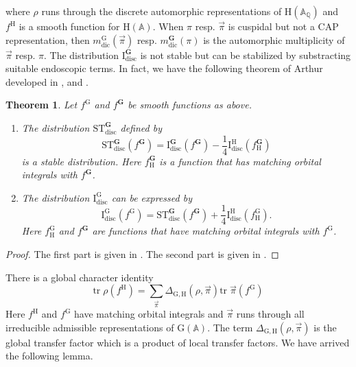 \documentclass[10pt]{amsart}
\numberwithin{equation}{section}
\newtheorem{theorem}[equation]{Theorem}
\theoremstyle{definition}
\def\bfG{\mathbf{G}}
\def\QQ{\mathbb{Q}}
\def\rmG{\mathrm{G}}
\def\rmH{\mathrm{H}}
\def\rmI{\mathrm{I}}
\begin{document}
where $\rho$ runs through the discrete automorphic representations of $\rmH(\mathbb{A}_{\QQ})$ and $f^{\rmH}$ is a smooth function for $\rmH(\mathbb{A})$.
When $\pi$ resp. $\vec{\pi}$ is cuspidal  but not a CAP representation, then $m^{\rmG}_{\mathrm{dic}}(\vec{\pi})$ resp. $m^{\bfG}_{\mathrm{dic}}(\pi)$ is the automorphic multiplicity of $\vec{\pi}$ resp. $\pi$. The distribution $\rmI^{\bfG}_{\mathrm{disc}}$ is not stable but can be stabilized by substracting suitable endoscopic terms. In fact, we have the following theorem of Arthur developed in \cite{Art-1}, \cite{Art-2} and \cite{Art-Main}.
\begin{theorem}\label{Arthur}
Let $f^{\rmG}$ and $f^{\bfG}$ be smooth functions as above.
\begin{enumerate}
\item The distribution $\mathrm{ST}^{\bfG}_{\mathrm{disc}}$ defined by
\begin{equation*}
\mathrm{ST}^{\bfG}_{\mathrm{disc}}(f^{\bfG})=\rmI^{\bfG}_{\mathrm{disc}}(f^{\bfG})-\frac{1}{4}\rmI^{\rmH}_{\mathrm{disc}}(f^{\bfG}_{\rmH})
\end{equation*}
is a stable distribution. Here $f^{\bfG}_{\rmH}$ is a function that has matching orbital integrals with $f^{\bfG}$.

\item The distribution $\mathrm{I}^{\rmG}_{\mathrm{disc}}$ can be expressed by
\begin{equation*}
\mathrm{I}^{\rmG}_{\mathrm{disc}}(f^{\rmG})=\mathrm{ST}^{\bfG}_{\mathrm{disc}}(f^{\bfG})+\frac{1}{4}\rmI^{\rmH}_{\mathrm{disc}}(f^{\rmG}_{\rmH}).
\end{equation*}
Here $f^{\rmG}_{\rmH}$  and $f^{\bfG}$ are functions that have matching orbital integrals with $f^{\rmG}$.
\end{enumerate}
\end{theorem}
\begin{proof}
The first part is given in \cite[Theorem 5.7]{Sor09}. The second part is given in \cite[Theorem 5.8]{Sor09}.
\end{proof}
There is a global character identity
\begin{equation}\label{char1}
\mathrm{tr}\phantom{.}\rho (f^{\rmH})=\sum\limits_{\vec{\pi}}\Delta_{\rmG, \rmH}(\rho, \vec{\pi})\mathrm{tr}\phantom{.}\vec{\pi}(f^{\rmG})
\end{equation}
Here $f^{\rmH}$ and $f^{\rmG}$ have matching orbital integrals and $\vec{\pi}$ runs through all irreducible admissible representations of $\rmG(\mathbb{A})$. The term $\Delta_{\rmG, \rmH}(\rho, \vec{\pi})$ is the global transfer factor which is a product of local transfer factors. We have arrived the following lemma.
\end{document}
